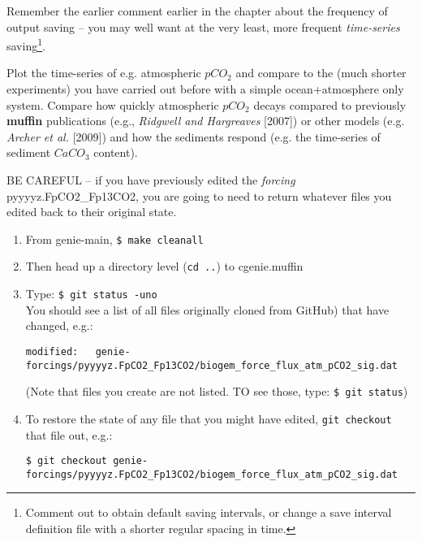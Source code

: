 Remember the earlier comment earlier in the chapter about the frequency of output saving -- you may well want at the very least, more frequent \textit{time-series} saving\footnote{Comment out to obtain default saving intervals, or change a save interval definition file with a shorter regular spacing in time.}.

Plot the time-series of e.g. atmospheric \(pCO_{2}\) and compare to the (much shorter experiments) you have carried out before with a simple ocean+atmosphere only system. Compare how quickly atmospheric \(pCO_{2}\) decays compared to previously \textbf{muffin} publications (e.g., \textit{Ridgwell and Hargreaves} [2007]) or other models (e.g. \textit{Archer et al.} [2009]) and  how the sediments respond (e.g. the time-series of sediment \(CaCO_{3}\) content).

\newpage

\noindent BE CAREFUL -- if you have previously edited the \textit{forcing} \textsf{\footnotesize  pyyyyz.FpCO2\_Fp13CO2}, you are going to need to return whatever files you edited back to their original state.
\small\begin{enumerate}[noitemsep]
\vspace{1mm}
\item From \textsf{\footnotesize genie-main}, \texttt{\$ make cleanall}
\vspace{1mm}
\item Then head up a directory level (\texttt{cd ..}) to \textsf{\footnotesize cgenie.muffin}
\vspace{1mm}
\item Type: \texttt{\$ git status -uno}
\vspace{1mm}
\\You should see a list of all files originally cloned from GitHub) that have changed, e.g.:
\vspace{-1mm}\begin{verbatim}
modified:   genie-forcings/pyyyyz.FpCO2_Fp13CO2/biogem_force_flux_atm_pCO2_sig.dat
\end{verbatim}\vspace{-1mm}
(Note that files you create are not listed. TO see those, type: \texttt{\$ git status})
\vspace{1mm}
\item To restore the state of any file that you might have edited, \texttt{git checkout} that file out, e.g.:
\vspace{-1mm}\begin{verbatim}
$ git checkout genie-forcings/pyyyyz.FpCO2_Fp13CO2/biogem_force_flux_atm_pCO2_sig.dat
\end{verbatim}\vspace{-1mm}
\end{enumerate}\normalsize

